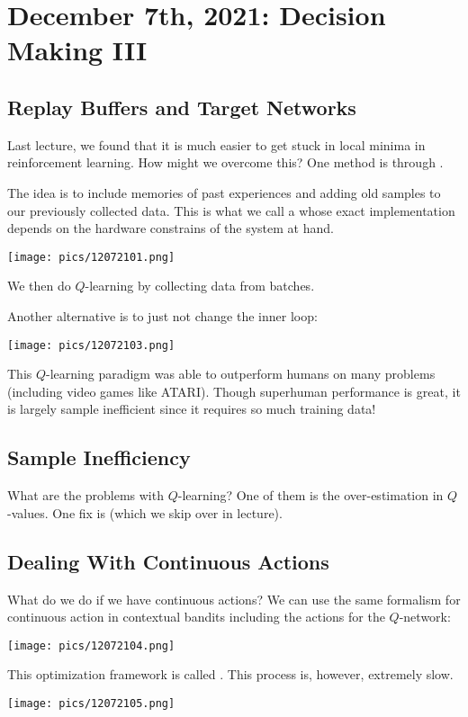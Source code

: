 \documentclass[11pt]{scrartcl}
\begin{document}
\newpage

\section{December 7th, 2021: Decision Making III}

\subsection{Replay Buffers and Target Networks}
Last lecture, we found that it is much easier to get stuck in local minima in reinforcement learning. How might we overcome this? One method is through .  

The idea is to include memories of past experiences and adding old samples to our previously collected data. This is what we call a  whose exact implementation depends on the hardware constrains of the system at hand.

\begin{center}
    \texttt{[image: pics/12072101.png]}
\end{center}

We then do $Q$-learning by collecting data from batches.

Another alternative is to just not change the inner loop:
\begin{center}
    \texttt{[image: pics/12072103.png]}
\end{center}

This $Q$-learning paradigm was able to outperform humans on many problems (including video games like ATARI). Though superhuman performance is great, it is largely sample inefficient since it requires so much training data!

\subsection{Sample Inefficiency}
What are the problems with $Q$-learning? One of them is the over-estimation in $Q$-values. One fix is  (which we skip over in lecture). 

\subsection{Dealing With Continuous Actions}
What do we do if we have continuous actions? We can use the same formalism for continuous action in contextual bandits including the actions for the $Q$-network:
\begin{center}
    \texttt{[image: pics/12072104.png]}
\end{center}
This optimization framework is called . This process is, however, extremely slow. 
\begin{center}
    \texttt{[image: pics/12072105.png]}
\end{center}
\end{document}
